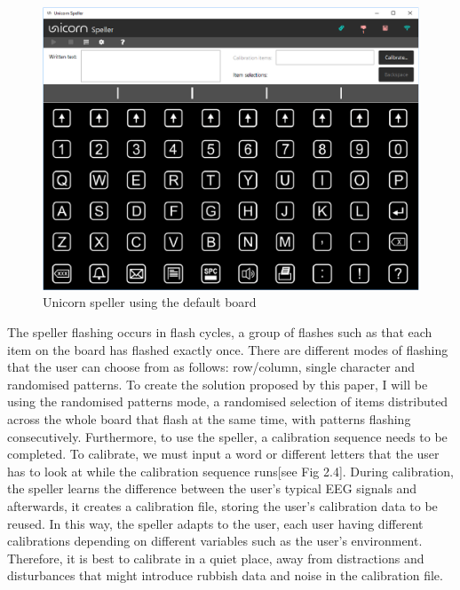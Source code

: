 \begin{figure}[H]
  \centering
  \includegraphics[width=1\textwidth]{Graphics/Speller.png}
  \caption{Unicorn speller using the default board}
\end{figure}

The speller flashing occurs in flash cycles, a group of flashes such as that each item on the board has flashed exactly once. There are different modes of flashing that the user can choose from as follows: row/column, single character and randomised patterns. To create the solution proposed by this paper, I will be using the randomised patterns mode, a randomised selection of items distributed across the whole board that flash at the same time, with patterns flashing consecutively\cite{UnicornSuite_Manual}. 
\vspace{\baselineskip}\newline
Furthermore, to use the speller, a calibration sequence needs to be completed. To calibrate, we must input a word or different letters that the user has to look at while the calibration sequence runs[see Fig 2.4]. During calibration, the speller learns the difference between the user's typical EEG signals and afterwards, it creates a calibration file, storing the user's calibration data to be reused. In this way, the speller adapts to the user, each user having different calibrations depending on different variables such as the user's environment. Therefore, it is best to calibrate in a quiet place, away from distractions and disturbances that might introduce rubbish data and noise in the calibration file.

